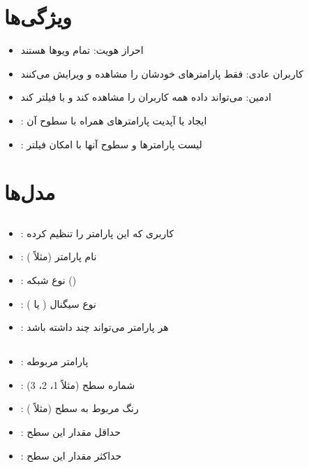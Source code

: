 \documentclass{report}
\begin{document}
\section{ویژگی‌ها}
\begin{itemize}
    \item احراز هویت: تمام ویوها  هستند
    \item کاربران عادی: فقط پارامترهای خودشان را مشاهده و ویرایش می‌کنند
    \item ادمین: می‌تواند داده همه کاربران را مشاهده کند و با  فیلتر کند
    \item {}: ایجاد یا آپدیت پارامترهای  همراه با سطوح آن
    \item {}: لیست پارامترها و سطوح آنها با امکان فیلتر
\end{itemize}

\section{مدل‌ها}
\subsection{}
\begin{itemize}
    \item {}: کاربری که این پارامتر را تنظیم کرده
    \item {}: نام پارامتر (مثلاً )
    \item {}: نوع شبکه ()
    \item {}: نوع سیگنال ( یا )
    \item {}: هر پارامتر می‌تواند چند  داشته باشد
\end{itemize}

\subsection{}
\begin{itemize}
    \item {}: پارامتر مربوطه
    \item {}: شماره سطح (مثلاً 1، 2، 3)
    \item {}: رنگ مربوط به سطح (مثلاً )
    \item {}: حداقل مقدار این سطح
    \item {}: حداکثر مقدار این سطح
\end{itemize}
\end{document}
